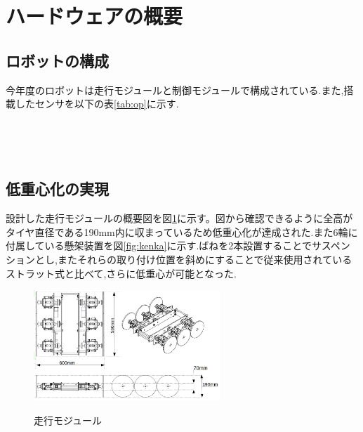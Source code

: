 \documentclass[twocolumn,11pt]{sotsuken_abst}
\begin{document}
\section{ハードウェアの概要}
\subsection{ロボットの構成}

今年度のロボットは走行モジュールと制御モジュールで構成されている.また,搭載したセンサを以下の表\ref{tab:op}に示す.


\begin{table}[h]
 　\begin{center}
    \caption{ハードウェアの構成}
    \small
　   \label{tab:op}
  \end{center}
\end{table}


\subsection{低重心化の実現}
設計した走行モジュールの概要図を図\ref{fig:cad}に示す。図から確認できるように全高がタイヤ直径である190mm内に収まっているため低重心化が達成された.また6輪に付属している懸架装置を図\ref{fig:kenka}に示す.ばねを2本設置することでサスペンションとし,またそれらの取り付け位置を斜めにすることで従来使用されているストラット式と比べて,さらに低重心が可能となった.

\begin{figure}[htp]
 \begin{center}
  \includegraphics[width=70mm]{4.png}
 　\caption{走行モジュール}
  \label{fig:cad}%
 \end{center}
\end{figure}
\end{document}
